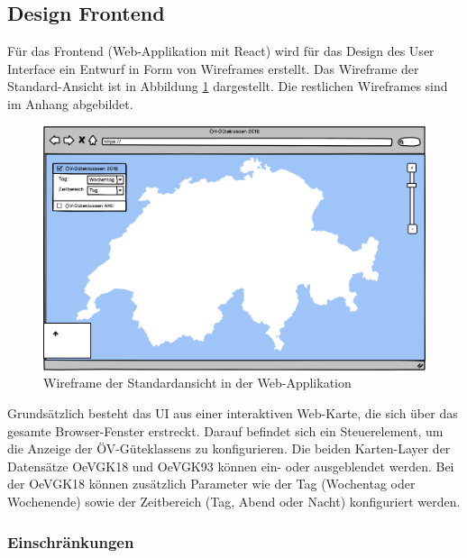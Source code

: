 


\subsection{Design Frontend}
\label{analyse:Design Frontend}

Für das Frontend (Web-Applikation mit React) wird für das Design des User Interface ein Entwurf in Form von Wireframes erstellt.
Das Wireframe der Standard-Ansicht ist in Abbildung \ref{fig:wireframe_main} dargestellt.
Die restlichen Wireframes sind im Anhang  abgebildet.

\begin{figure}[ht]
    \centering
    \includegraphics[width=1\linewidth]{projectdoc/img/wireframes/standardansicht.png}
    \caption[Wireframe der Standardansicht in der Web-Applikation]{Wireframe der Standardansicht in der Web-Applikation}
    \label{fig:wireframe_main}
\end{figure}

Grundsätzlich besteht das UI aus einer interaktiven Web-Karte, die sich über das gesamte Browser-Fenster erstreckt.
Darauf befindet sich ein Steuerelement, um die Anzeige der \glspl{ÖV-Güteklassen} zu konfigurieren.
Die beiden Karten-Layer der Datensätze \gls{OeVGK18} und \gls{OeVGK93} können ein- oder ausgeblendet werden.
Bei der \gls{OeVGK18} können zusätzlich Parameter wie der Tag (Wochentag oder Wochenende) sowie der Zeitbereich (Tag, Abend oder Nacht) konfiguriert werden.

\subsubsection{Einschränkungen}
\label{Analyse:Einschränkungen}

